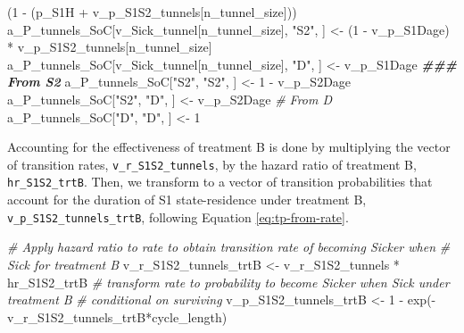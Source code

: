 \documentclass[
]{article}
\newenvironment{Shaded}{\begin{snugshade}}{\end{snugshade}}
\newcommand{\CommentTok}[1]{\textcolor[rgb]{0.56,0.35,0.01}{\textit{#1}}}
\newcommand{\DecValTok}[1]{\textcolor[rgb]{0.00,0.00,0.81}{#1}}
\newcommand{\DocumentationTok}[1]{\textcolor[rgb]{0.56,0.35,0.01}{\textbf{\textit{#1}}}}
\newcommand{\FunctionTok}[1]{\textcolor[rgb]{0.00,0.00,0.00}{#1}}
\newcommand{\NormalTok}[1]{#1}
\newcommand{\OtherTok}[1]{\textcolor[rgb]{0.56,0.35,0.01}{#1}}
\newcommand{\SpecialCharTok}[1]{\textcolor[rgb]{0.00,0.00,0.00}{#1}}
\newcommand{\StringTok}[1]{\textcolor[rgb]{0.31,0.60,0.02}{#1}}
\begin{document}
\begin{Shaded}
\begin{Highlighting}[]
\NormalTok{                                                   (}\DecValTok{1} \SpecialCharTok{{-}}\NormalTok{ (p\_S1H }\SpecialCharTok{+}\NormalTok{ v\_p\_S1S2\_tunnels[n\_tunnel\_size]))}
\NormalTok{a\_P\_tunnels\_SoC[v\_Sick\_tunnel[n\_tunnel\_size], }\StringTok{"S2"}\NormalTok{, ] }\OtherTok{\textless{}{-}}\NormalTok{ (}\DecValTok{1} \SpecialCharTok{{-}}\NormalTok{ v\_p\_S1Dage) }\SpecialCharTok{*} 
\NormalTok{                                                     v\_p\_S1S2\_tunnels[n\_tunnel\_size]}
\NormalTok{a\_P\_tunnels\_SoC[v\_Sick\_tunnel[n\_tunnel\_size], }\StringTok{"D"}\NormalTok{, ]  }\OtherTok{\textless{}{-}}\NormalTok{ v\_p\_S1Dage}
\DocumentationTok{\#\#\# From S2}
\NormalTok{a\_P\_tunnels\_SoC[}\StringTok{"S2"}\NormalTok{, }\StringTok{"S2"}\NormalTok{, ] }\OtherTok{\textless{}{-}} \DecValTok{1} \SpecialCharTok{{-}}\NormalTok{ v\_p\_S2Dage}
\NormalTok{a\_P\_tunnels\_SoC[}\StringTok{"S2"}\NormalTok{, }\StringTok{"D"}\NormalTok{, ]  }\OtherTok{\textless{}{-}}\NormalTok{ v\_p\_S2Dage}
\CommentTok{\# From D}
\NormalTok{a\_P\_tunnels\_SoC[}\StringTok{"D"}\NormalTok{, }\StringTok{"D"}\NormalTok{, ] }\OtherTok{\textless{}{-}} \DecValTok{1}
\end{Highlighting}
\end{Shaded}

Accounting for the effectiveness of treatment B is done by multiplying the vector of transition rates, \texttt{v\_r\_S1S2\_tunnels}, by the hazard ratio of treatment B, \texttt{hr\_S1S2\_trtB}. Then, we transform to a vector of transition probabilities that account for the duration of S1 state-residence under treatment B, \texttt{v\_p\_S1S2\_tunnels\_trtB}, following Equation \eqref{eq:tp-from-rate}.

\begin{Shaded}
\begin{Highlighting}[]
\CommentTok{\# Apply hazard ratio to rate to obtain transition rate of becoming Sicker when }
\CommentTok{\# Sick for treatment B}
\NormalTok{v\_r\_S1S2\_tunnels\_trtB }\OtherTok{\textless{}{-}}\NormalTok{ v\_r\_S1S2\_tunnels }\SpecialCharTok{*}\NormalTok{ hr\_S1S2\_trtB}
\CommentTok{\# transform rate to probability to become Sicker when Sick under treatment B }
\CommentTok{\# conditional on surviving}
\NormalTok{v\_p\_S1S2\_tunnels\_trtB }\OtherTok{\textless{}{-}} \DecValTok{1} \SpecialCharTok{{-}} \FunctionTok{exp}\NormalTok{(}\SpecialCharTok{{-}}\NormalTok{v\_r\_S1S2\_tunnels\_trtB}\SpecialCharTok{*}\NormalTok{cycle\_length) }
\end{Highlighting}
\end{Shaded}
\end{document}
